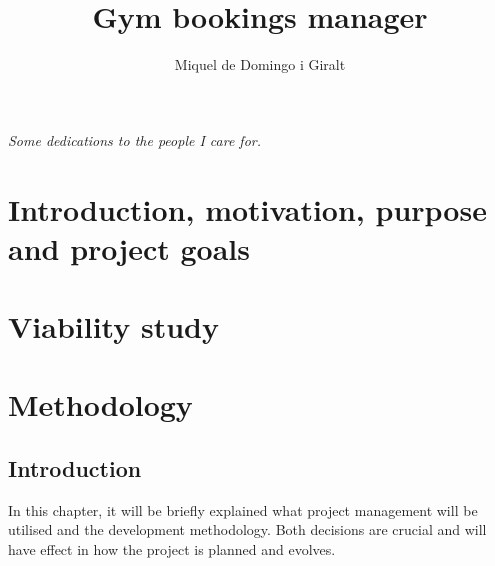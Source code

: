 \documentclass[a4paper, 12pt, oneside]{book}
\title{{\Huge Gym bookings manager}}
\author{Miquel de Domingo i Giralt}
\begin{document}
\frontmatter
\maketitle
\newpage\null\thispagestyle{empty}\newpage
\thispagestyle{empty}
\begin{flushright}
	\emph{Some dedications to the people I care for.}
\end{flushright}
\newpage
\thispagestyle{empty}
\tableofcontents
\newpage
\listoffigures
\newpage\null\thispagestyle{empty}\newpage
\mainmatter
\chapter{Introduction, motivation, purpose and project goals}
\chapter{Viability study}
\chapter{Methodology}
\section{Introduction}
In this chapter, it will be briefly explained what project management will be utilised and the development methodology. Both decisions are crucial and will have effect in how the project is planned and evolves.
\end{document}
